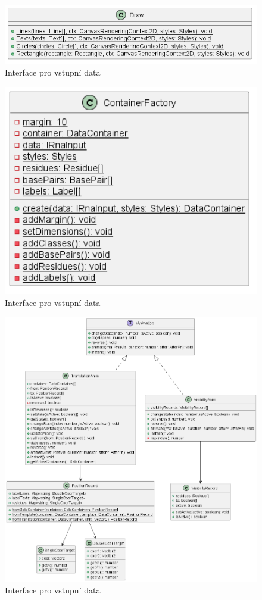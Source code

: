 \begin{figure}[H]
  \centering
  \includegraphics[width=145mm]{../img/draw.png}
  \caption{Interface pro vstupní data}
\end{figure}

\begin{figure}[H]
  \centering
  \includegraphics[width=145mm]{../img/containerFactory.png}
  \caption{Interface pro vstupní data}
\end{figure}

\begin{figure}[H]
  \centering
  \includegraphics[width=145mm]{../img/animations.png}
  \caption{Interface pro vstupní data}
\end{figure}


